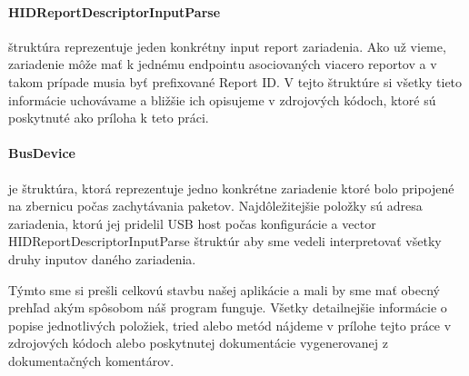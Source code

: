 \paragraph{HIDReportDescriptorInputParse}\label{kap04:sec:hid_report_input_parse} štruktúra reprezentuje jeden konkrétny input report zariadenia. Ako už vieme, zariadenie môže mať k jednému endpointu asociovaných viacero reportov a v takom prípade musia byť prefixované Report ID. V tejto štruktúre si všetky tieto informácie uchovávame a bližšie ich opisujeme v zdrojových kódoch, ktoré sú poskytnuté ako príloha k teto práci.

\paragraph{BusDevice}\label{kap04:sec:bus_device} je štruktúra, ktorá reprezentuje jedno konkrétne zariadenie ktoré bolo pripojené na zbernicu počas zachytávania paketov. Najdôležitejšie položky sú adresa zariadenia, ktorú jej pridelil USB host počas konfigurácie a vector HIDReportDescriptorInputParse štruktúr aby sme vedeli interpretovať všetky druhy inputov daného zariadenia.

Týmto sme si prešli celkovú stavbu našej aplikácie a mali by sme mať obecný prehľad akým spôsobom náš program funguje. Všetky detailnejšie informácie o popise jednotlivých položiek, tried alebo metód nájdeme v prílohe tejto práce v zdrojových kódoch alebo poskytnutej dokumentácie vygenerovanej z dokumentačných komentárov.